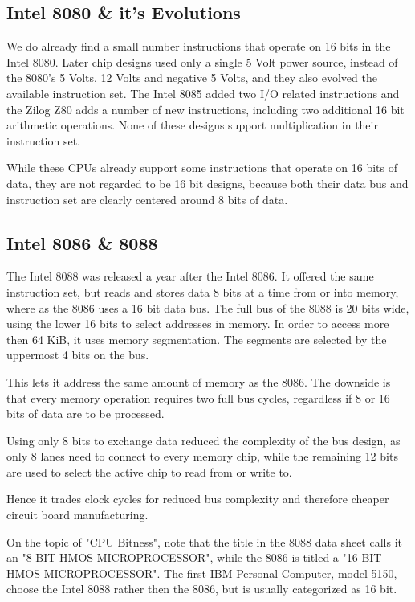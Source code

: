 \documentclass[twoside,twocolumn]{article}
\begin{document}
\subsection{Intel 8080 \& it's Evolutions}

We do already find a small number instructions that operate on 16 bits in the Intel 8080.
Later chip designs used only a single 5 Volt power source, instead of the 8080's 5 Volts,
12 Volts and negative 5 Volts, and they also evolved the available instruction set. The
Intel 8085 added two I/O related instructions and the Zilog Z80 adds a number of new
instructions, including two additional 16 bit arithmetic operations. None of these designs
support multiplication in their instruction set. \cite{softwaresolutions}

While these CPUs already support some instructions that operate on 16 bits of data, they
are not regarded to be 16 bit designs, because both their data bus and instruction set
are clearly centered around 8 bits of data.

\subsection{Intel 8086 \& 8088}

The Intel 8088 was released a year after the Intel 8086. It offered the same instruction
set, but reads and stores data 8 bits at a time from or into memory, where as the 8086
uses a 16 bit data bus. The full bus of the 8088 is 20 bits wide, using the lower 16 bits
to select addresses in memory. In order to access more then 64 KiB, it uses memory
segmentation. The segments are selected by the uppermost 4 bits on the bus.

This lets it address the same amount of memory as the 8086. The downside is that every
memory operation requires two full bus cycles, regardless if 8 or 16 bits of data are
to be processed.

Using only 8 bits to exchange data reduced the complexity of the bus design, as only 8
lanes need to connect to every memory chip, while the remaining 12 bits are used to
select the active chip to read from or write to.

Hence it trades clock cycles for reduced bus complexity and therefore cheaper circuit
board manufacturing.

On the topic of "CPU Bitness", note that the title in the 8088 data sheet calls it an
"8-BIT HMOS MICROPROCESSOR"\cite{intel8088}, while the 8086 is titled a "16-BIT HMOS
MICROPROCESSOR"\cite{intel8086}. The first IBM Personal Computer, model 5150, choose
the Intel 8088 rather then the 8086, but is usually categorized as 16 bit.
\end{document}
